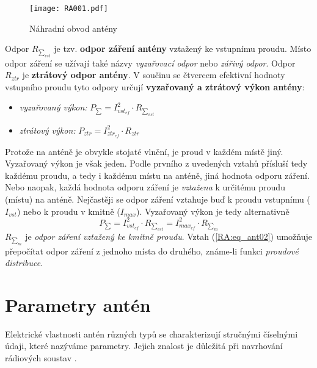       \begin{figure}[ht!]   %
        \centering
        \texttt{[image: RA001.pdf]}
        \caption{Náhradní obvod antény}
        \label{RA:fig_001}
      \end{figure}
      
      Odpor \(R_{\sum_{vst}}\) je tzv. \textbf{odpor záření antény} vztažený ke vstupnímu proudu. 
      Místo odpor záření se užívají také názvy \emph{vyzařovací odpor} nebo \emph{zářivý odpor}. 
      Odpor  \(R_{ztr}\) je \textbf{ztrátový odpor antény}. V součinu se čtvercem efektivní hodnoty 
      vstupního proudu tyto odpory určují \textbf{vyzařovaný a ztrátový výkon antény}:
      \begin{itemize}[noitemsep]
        \item \emph{vyzařovaný výkon:} \(P_{\sum} = I^2_{vst_{ef}}\cdot R_{\sum_{vst}}\)
        \item \emph{ztrátový výkon:}   \(P_{ztr} = I^2_{ztr_{ef}}\cdot R_{ztr}\)
      \end{itemize}
      Protože na anténě je obvykle stojaté vlnění, je proud v každém místě jiný. Vyzařovaný výkon 
      je však jeden. Podle prvního z uvedených vztahů přísluší tedy každému proudu, a tedy i 
      každému místu na anténě, jiná hodnota odporu záření. Nebo naopak, každá hodnota odporu záření 
      je \emph{vztažena} k určitému proudu (místu) na anténě. Nejčastěji se odpor záření vztahuje 
      buď k proudu vstupnímu (\(I_{vst}\)) nebo k proudu v kmitně (\(I_{max}\)). Vyzařovaný výkon 
      je tedy alternativně
      \begin{equation}\label{RA:eq_ant02}
        P_{\sum} = I^2_{vst_{ef}}\cdot R_{\sum_{vst}} = I^2_{max_{ef}}\cdot R_{\sum_{m}}
      \end{equation} 
      \(R_{\sum_{m}}\) je \emph{odpor záření vztažený ke kmitně proudu}. Vztah (\ref{RA:eq_ant02}) 
      umožňuje přepočítat odpor záření z jednoho místa do druhého, známe-li funkci \emph{proudové 
      distribuce}. 
      
      
     
  \section{Parametry antén}
    Elektrické vlastnosti antén různých typů se charakterizují stručnými číselnými údaji, které 
    nazýváme parametry. Jejich znalost je důležitá při navrhování rádiových soustav 
    \cite[s.~46]{Hanus2002}. 

